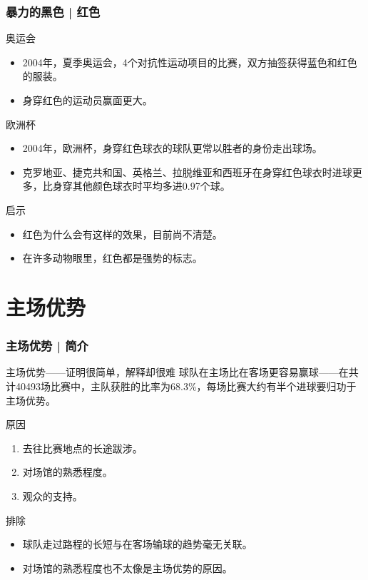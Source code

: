 \begin{frame}
  \frametitle{暴力的黑色 | 红色}
  \begin{block}{奥运会}
    \begin{itemize}
      \item 2004年，夏季奥运会，4个对抗性运动项目的比赛，双方抽签获得蓝色和红色的服装。
      \item 身穿红色的运动员赢面更大。
    \end{itemize}
  \end{block}
  \pause
  \begin{block}{欧洲杯}
    \begin{itemize}
      \item 2004年，欧洲杯，身穿红色球衣的球队更常以胜者的身份走出球场。
      \item 克罗地亚、捷克共和国、英格兰、拉脱维亚和西班牙在身穿红色球衣时进球更多，比身穿其他颜色球衣时平均多进0.97个球。
    \end{itemize}
  \end{block}
  \pause
  \begin{block}{启示}
    \begin{itemize}
      \item 红色为什么会有这样的效果，目前尚不清楚。
      \item 在许多动物眼里，红色都是强势的标志。
    \end{itemize}
  \end{block}
\end{frame}

\section{主场优势}
\begin{frame}
  \frametitle{主场优势 | 简介}
  \begin{block}{主场优势——证明很简单，解释却很难}
    球队在主场比在客场更容易赢球——在共计40493场比赛中，主队获胜的比率为68.3\%，每场比赛大约有半个进球要归功于主场优势。
  \end{block}
  \pause
  \begin{block}{原因}
    \begin{enumerate}
      \item 去往比赛地点的长途跋涉。
      \item 对场馆的熟悉程度。
      \item 观众的支持。
    \end{enumerate}
  \end{block}
  \pause
  \begin{block}{排除}
    \begin{itemize}
      \item 球队走过路程的长短与在客场输球的趋势毫无关联。
      \item 对场馆的熟悉程度也不太像是主场优势的原因。
    \end{itemize}
  \end{block}
\end{frame}

